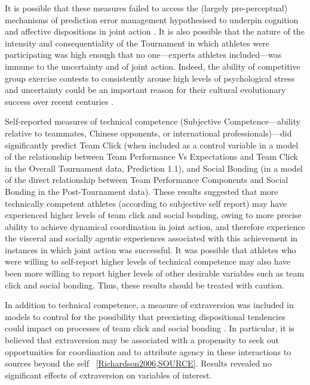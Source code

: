 \begin{CJK}{UTF8}{gbsn}
It is possible that these measures failed to access the (largely pre-perceptual) mechanisms of prediction error management hypothesised to underpin cognition and affective dispositions in joint action \citep{Clark2013}.  It is also possible that the nature of the intensity and consequentiality of the Tournament in which athletes were participating was high enough that no one---experts athletes included---was immune to the uncertainty and of joint action.  Indeed, the ability of competitive group exercise contests to consistently arouse high levels of psychological stress and uncertainty could be an important reason for their cultural evolutionary success over recent centuries \citep{Dunbar2010,Whitehouse2004}.

Self-reported measures of technical competence (Subjective Competence---ability relative to teammates, Chinese opponents, or international professionals)—did significantly
predict Team Click (when included as a control variable in a model of the relationship between Team Performance Vs Expectations and Team Click in the Overall Tournament data, Prediction 1.1), and Social Bonding (in a model of the direct relationship between Team Performance Components and Social Bonding in the Post-Tournament data).  These results suggested that more technically competent athletes (according to subjective self report) may have experienced higher levels of team click and social bonding, owing to more precise ability to achieve dynamical coordination in joint action, and therefore experience the visceral and socially agentic experiences associated with this achievement in instances in which joint action was successful.  It was possible that athletes who were willing to self-report higher levels of technical competence may also have been more willing to report higher levels of other desirable variables such as team click and social bonding. Thus, these results should be treated with caution.

In addition to technical competence, a measure of extraversion was included in models to control for the possibility that preexisting dispositional tendencies could impact on processes of team click and social bonding \citep{Marsh2009,VonRueden2015}.  In particular, it is believed that extraversion may be associated with a propensity to seek out opportunities for coordination and to attribute agency in these interactions to sources beyond the self ~\ref{Richardson2006,SOURCE}.  Results revealed no significant effects of extraversion on variables of interest.


\end{CJK}
